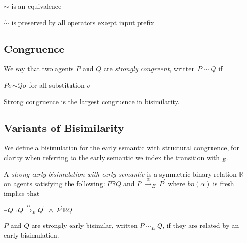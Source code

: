 \begin{proposition}
  $\dot{\sim}$ is an equivalence
\end{proposition}

\begin{proposition}
  $\dot{\sim}$ is preserved by all operators except input prefix
\end{proposition}


\subsection{Congruence}

\begin{definition}
  We say that two agents $P$ and $Q$ are \emph{strongly congruent}, written $P\sim Q$ if
  \begin{center}
    $P\sigma \dot{\sim} Q\sigma$ for all substitution $\sigma$    
  \end{center}
\end{definition}

\begin{proposition}
  Strong congruence is the largest congruence in bisimilarity.
\end{proposition}

\subsection{Variants of Bisimilarity}

We define a bisimulation for the early semantic with structural congruence, for clarity when referring to the early semantic we index the transition with $ _{E}$. 
\begin{definition}
  A \emph{strong early bisimulation with early semantic} is a symmetric binary relation $\mathbb{R}$ on agents satisfying the following: $P\mathbb{R} Q$ and $P\; \xrightarrow{\alpha}_{E}\; P^{'}$ where $bn(\alpha)$ is fresh implies that
  \begin{center}
    $\exists Q^{'}: Q\xrightarrow{\alpha}_{E}Q^{'}\; \wedge\; P^{'}\mathbb{R}Q^{'}$
  \end{center}
  $P$ and $Q$ are strongly early bisimilar, written $P\; \dot{\sim}_{E}\; Q$, if they are related by an early bisimulation.
\end{definition}

